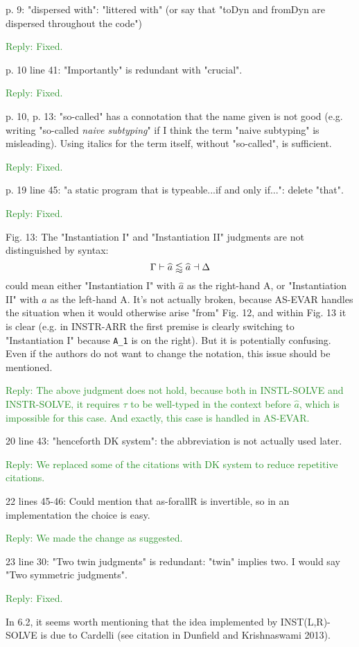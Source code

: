 \documentclass[dvipsnames]{article}
\newcommand\reply[1]{\textcolor{ForestGreen}{Reply: #1}}
\begin{document}
p. 9: "dispersed with": "littered with" (or say that "toDyn and fromDyn are
dispersed throughout the code")

\reply{Fixed.}

p. 10 line 41: "Importantly" is redundant with "crucial".

\reply{Fixed.}

p. 10, p. 13: "so-called" has a connotation that the name given is not good
(e.g. writing "so-called \emph{naive subtyping}" if I think the term "naive
subtyping" is misleading). Using italics for the term itself, without
"so-called", is sufficient.

\reply{Fixed.}

p. 19 line 45: "a static program that is typeable...if and only if...": delete
"that".

\reply{Fixed.}

Fig. 13: The "Instantiation I" and "Instantiation II" judgments are not
distinguished by syntax:
\[
  \Gamma \vdash \widehat{a} \lessapprox \widehat{a} \dashv \Delta
\]
could mean either "Instantiation I" with $\widehat{a}$ as the right-hand A, or
"Instantiation II" with $\widehat{a}$ as the left-hand A. It's not actually
broken, because AS-EVAR handles the situation when it would otherwise arise
"from" Fig. 12, and within Fig. 13 it is clear (e.g. in INSTR-ARR the first
premise is clearly switching to "Instantiation I" because \verb|A_1| is on the
right). But it is potentially confusing. Even if the authors do not want to
change the notation, this issue should be mentioned.

\reply{The above judgment does not hold, because both in INSTL-SOLVE and
  INSTR-SOLVE, it requires $\tau$ to be well-typed in the context before
  $\widehat{a}$, which is impossible for this case. And exactly, this case is
  handled in AS-EVAR.}

20 line 43: "henceforth DK system": the abbreviation is not actually used later.

\reply{We replaced some of the citations with DK system to reduce repetitive
  citations.}

22 lines 45-46: Could mention that as-forallR is invertible, so in an
implementation the choice is easy.

\reply{We made the change as suggested.}

23 line 30: "Two twin judgments" is redundant: "twin" implies two. I would say
"Two symmetric judgments".

\reply{Fixed.}

In 6.2, it seems worth mentioning that the idea implemented by INST(L,R)-SOLVE
is due to Cardelli (see citation in Dunfield and Krishnaswami 2013).
\end{document}
